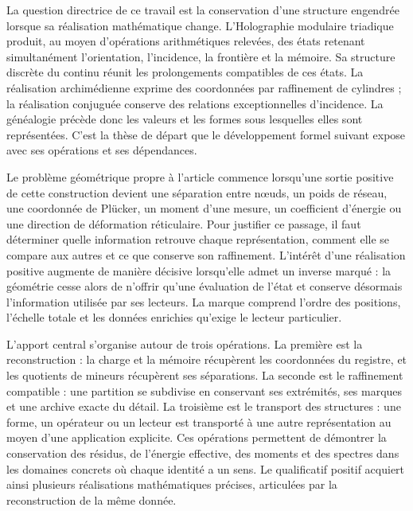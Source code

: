 La question directrice de ce travail est la conservation d'une structure engendrée lorsque sa réalisation mathématique change. L'Holographie modulaire triadique produit, au moyen d'opérations arithmétiques relevées, des états retenant simultanément l'orientation, l'incidence, la frontière et la mémoire. Sa structure discrète du continu réunit les prolongements compatibles de ces états. La réalisation archimédienne exprime des coordonnées par raffinement de cylindres ; la réalisation conjuguée conserve des relations exceptionnelles d'incidence. La généalogie précède donc les valeurs et les formes sous lesquelles elles sont représentées. C'est la thèse de départ que le développement formel suivant expose avec ses opérations et ses dépendances.

Le problème géométrique propre à l’article commence lorsqu’une sortie
positive de cette construction devient une séparation entre nœuds,
un poids de réseau, une coordonnée de Plücker, un moment d’une mesure, un coefficient
d’énergie ou une direction de déformation réticulaire. Pour justifier ce passage,
il faut déterminer quelle information retrouve chaque représentation, comment
elle se compare aux autres et ce que conserve son raffinement. L’intérêt
d’une réalisation positive augmente de manière décisive lorsqu’elle admet un
inverse marqué : la géométrie cesse alors de n’offrir qu’une évaluation
de l’état et conserve désormais l’information utilisée par ses lecteurs.
La marque comprend l’ordre des positions, l’échelle totale et les données
enrichies qu’exige le lecteur particulier.

L’apport central s’organise autour de trois opérations. La première
est la reconstruction : la charge et la mémoire récupèrent les coordonnées
du registre, et les quotients de mineurs récupèrent ses séparations.
La seconde est le raffinement compatible : une partition se subdivise
en conservant ses extrémités, ses marques et une archive exacte du détail.
La troisième est le transport des structures : une forme, un opérateur ou un
lecteur est transporté à une autre représentation au moyen d’une application explicite. Ces
opérations permettent de démontrer la conservation des résidus, de l’énergie effective,
des moments et des spectres dans les domaines concrets où chaque identité a
un sens. Le qualificatif positif acquiert ainsi plusieurs réalisations
mathématiques précises, articulées par la reconstruction de la même donnée.

